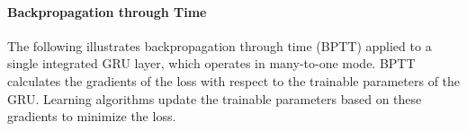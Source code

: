 \paragraph*{Backpropagation through Time}$\ $\\
The following illustrates backpropagation through time (BPTT) 
applied to a single integrated GRU layer, 
which operates in many-to-one mode. 
BPTT calculates the gradients of the loss with respect to the 
trainable parameters of the GRU. 
Learning algorithms update the trainable parameters 
based on these gradients to minimize the loss.









